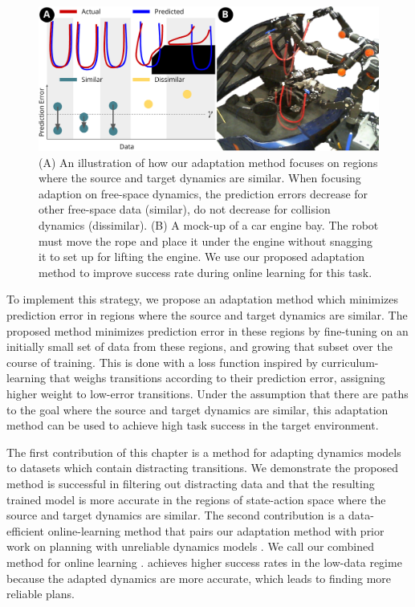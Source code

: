 \begin{figure}
    \centering
    \includegraphics[width=1\linewidth]{Chap4/images/title_figure.pdf}
    \caption{
    (A) An illustration of how our adaptation method focuses on regions where the source and target dynamics are similar. When focusing adaption on free-space dynamics, the prediction errors decrease for other free-space data (similar), do not decrease for collision dynamics (dissimilar).
    (B) A mock-up of a car engine bay. The robot must move the rope and place it under the engine without snagging it to set up for lifting the engine. We use our proposed adaptation method to improve success rate during online learning for this task.}
    \label{ICRA:fig:real_robot_setup}
\end{figure}

To implement this strategy, we propose an adaptation method which minimizes prediction error in regions where the source and target dynamics are similar. The proposed method minimizes prediction error in these regions by fine-tuning on an initially small set of data from these regions, and growing that subset over the course of training. This is done with a loss function inspired by curriculum-learning that weighs transitions according to their prediction error, assigning higher weight to low-error transitions. Under the assumption that there are paths to the goal where the source and target dynamics are similar, this adaptation method can be used to achieve high task success in the target environment.

The first contribution of this chapter is a method for adapting dynamics models to datasets which contain distracting transitions. We demonstrate the proposed method is successful in filtering out distracting data and that the resulting trained model is more accurate in the regions of state-action space where the source and target dynamics are similar. The second contribution is a data-efficient online-learning method that pairs our adaptation method with prior work on planning with unreliable dynamics models \cite{UnreliableMitrano2021,MDEs22}. We call our combined method for online learning \FOCUS{}. \FOCUS{} achieves higher success rates in the low-data regime because the adapted dynamics are more accurate, which leads to finding more reliable plans.